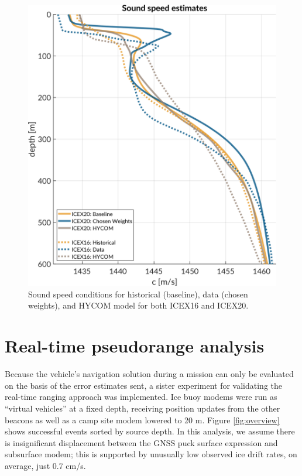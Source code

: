 \begin{figure}[h!]
	\centering
	\includegraphics[width=\reprintcolumnwidth]{figs/ssp-gvel-icex20-icex16.pdf}
	\caption{Sound speed conditions for historical (baseline), data (chosen weights), and HYCOM model for both ICEX16 and ICEX20.}
	\label{fig:sspExpectation}
\end{figure}

\clearpage
\section{\label{sec:realtime} Real-time pseudorange analysis}

Because the vehicle's navigation solution during a mission can only be evaluated on the basis of the error estimates sent, a sister experiment for validating the real-time ranging approach was implemented.
Ice buoy modems were run as ``virtual vehicles'' at a fixed depth, receiving position updates from the other beacons as well as a camp site modem lowered to 20 m. 
Figure \ref{fig:overview} shows successful events sorted by source depth.
In this analysis, we assume there is insignificant displacement between the GNSS puck surface expression and subsurface modem; this is supported by unusually low observed ice drift rates, on average, just 0.7 cm/s.

